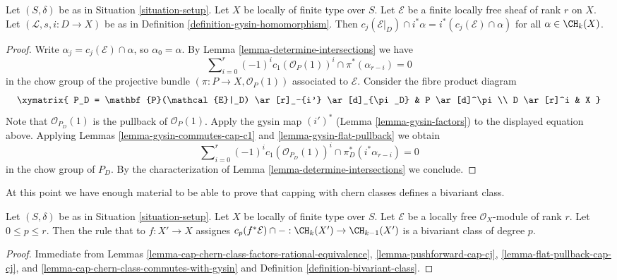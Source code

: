 \begin{lemma}
\label{lemma-cap-chern-class-commutes-with-gysin}
Let $(S, \delta)$ be as in Situation \ref{situation-setup}.
Let $X$ be locally of finite type over $S$.
Let $\mathcal{E}$ be a finite locally free sheaf of rank $r$ on $X$.
Let $(\mathcal{L}, s, i : D \to X)$ be as in
Definition \ref{definition-gysin-homomorphism}.
Then $c_j(\mathcal{E}|_D) \cap i^*\alpha = i^*(c_j(\mathcal{E}) \cap \alpha)$
for all $\alpha \in \CH_k(X)$.
\end{lemma}

\begin{proof}
Write $\alpha_j = c_j(\mathcal{E}) \cap \alpha$, so $\alpha_0 = \alpha$.
By Lemma \ref{lemma-determine-intersections} we have
$$
\sum\nolimits_{i = 0}^r
(-1)^i c_1(\mathcal{O}_P(1))^i \cap
\pi^*(\alpha_{r - i}) = 0
$$
in the chow group of the projective bundle
$(\pi : P \to X, \mathcal{O}_P(1))$
associated to $\mathcal{E}$. Consider the fibre product diagram
$$
\xymatrix{
P_D = \mathbf{P}(\mathcal{E}|_D) \ar[r]_-{i'} \ar[d]_{\pi_D} &
P \ar[d]^\pi \\
D \ar[r]^i & X
}
$$
Note that $\mathcal{O}_{P_D}(1)$ is the pullback of $\mathcal{O}_P(1)$.
Apply the gysin map $(i')^*$ (Lemma \ref{lemma-gysin-factors}) to the
displayed equation above.
Applying Lemmas \ref{lemma-gysin-commutes-cap-c1} and
\ref{lemma-gysin-flat-pullback} we obtain
$$
\sum\nolimits_{i = 0}^r
(-1)^i c_1(\mathcal{O}_{P_D}(1))^i \cap
\pi_D^*(i^*\alpha_{r - i}) = 0
$$
in the chow group of $P_D$.
By the characterization of Lemma \ref{lemma-determine-intersections}
we conclude.
\end{proof}

\noindent
At this point we have enough material to be able to prove that
capping with chern classes defines a bivariant class.

\begin{lemma}
\label{lemma-cap-cp-bivariant}
Let $(S, \delta)$ be as in Situation \ref{situation-setup}.
Let $X$ be locally of finite type over $S$.
Let $\mathcal{E}$ be a locally free $\mathcal{O}_X$-module
of rank $r$. Let $0 \leq p \leq r$.
Then the rule that to $f : X' \to X$ assignes
$c_p(f^*\mathcal{E}) \cap - : \CH_k(X') \to \CH_{k - 1}(X')$
is a bivariant class of degree $p$.
\end{lemma}

\begin{proof}
Immediate from Lemmas
\ref{lemma-cap-chern-class-factors-rational-equivalence},
\ref{lemma-pushforward-cap-cj},
\ref{lemma-flat-pullback-cap-cj}, and
\ref{lemma-cap-chern-class-commutes-with-gysin}
and Definition \ref{definition-bivariant-class}.
\end{proof}

